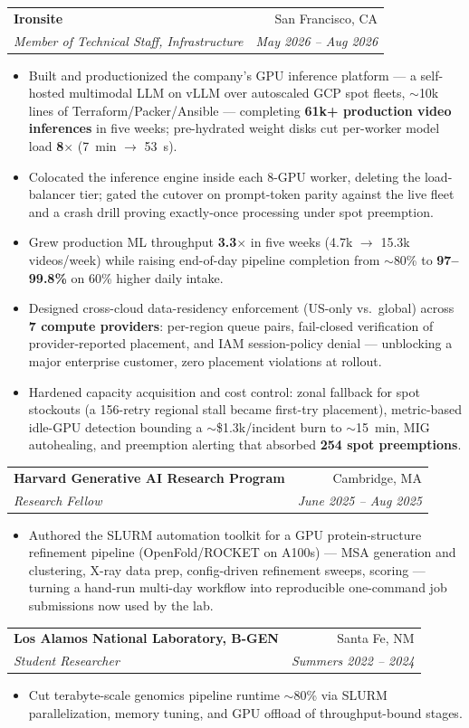 \documentclass[letterpaper,10pt]{article}
\makeatletter
\newcommand{\resumeItem}[1]{
  \item\small{
    {#1 \vspace{-2pt}}
  }
}
\newcommand{\resumeSubheading}[4]{
  \vspace{-2pt}\item
    \begin{tabular*}{0.97\textwidth}[t]{l@{\extracolsep{\fill}}r}
      \textbf{#1} & #2 \\
      \textit{\small#3} & \textit{\small #4} \\
    \end{tabular*}\vspace{-7pt}
}
\newcommand{\resumeItemListStart}{\begin{itemize}}
\newcommand{\resumeItemListEnd}{\end{itemize}\vspace{-5pt}}
\makeatother
\begin{document}
    \resumeSubheading
      {Ironsite}{San Francisco, CA}
      {Member of Technical Staff, Infrastructure}{May 2026 -- Aug 2026}
      \resumeItemListStart
        \resumeItem{Built and productionized the company's GPU inference platform --- a self-hosted multimodal LLM on vLLM over autoscaled GCP spot fleets, $\sim$10k lines of Terraform/Packer/Ansible --- completing \textbf{61k+ production video inferences} in five weeks; pre-hydrated weight disks cut per-worker model load \textbf{8$\times$} (7~min $\rightarrow$ 53~s).}
        \resumeItem{Colocated the inference engine inside each 8-GPU worker, deleting the load-balancer tier; gated the cutover on prompt-token parity against the live fleet and a crash drill proving exactly-once processing under spot preemption.}
        \resumeItem{Grew production ML throughput \textbf{3.3$\times$} in five weeks (4.7k $\rightarrow$ 15.3k videos/week) while raising end-of-day pipeline completion from $\sim$80\% to \textbf{97--99.8\%} on 60\% higher daily intake.}
        \resumeItem{Designed cross-cloud data-residency enforcement (US-only vs.\ global) across \textbf{7 compute providers}: per-region queue pairs, fail-closed verification of provider-reported placement, and IAM session-policy denial --- unblocking a major enterprise customer, zero placement violations at rollout.}
        \resumeItem{Hardened capacity acquisition and cost control: zonal fallback for spot stockouts (a 156-retry regional stall became first-try placement), metric-based idle-GPU detection bounding a $\sim$\$1.3k/incident burn to $\sim$15~min, MIG autohealing, and preemption alerting that absorbed \textbf{254 spot preemptions}.}
      \resumeItemListEnd

    \resumeSubheading
      {Harvard Generative AI Research Program}{Cambridge, MA}
      {Research Fellow}{June 2025 -- Aug 2025}
      \resumeItemListStart
        \resumeItem{Authored the SLURM automation toolkit for a GPU protein-structure refinement pipeline (OpenFold/ROCKET on A100s) --- MSA generation and clustering, X-ray data prep, config-driven refinement sweeps, scoring --- turning a hand-run multi-day workflow into reproducible one-command job submissions now used by the lab.}
      \resumeItemListEnd

    \resumeSubheading
      {Los Alamos National Laboratory, B-GEN}{Santa Fe, NM}
      {Student Researcher}{Summers 2022 -- 2024}
      \resumeItemListStart
        \resumeItem{Cut terabyte-scale genomics pipeline runtime $\sim$80\% via SLURM parallelization, memory tuning, and GPU offload of throughput-bound stages.}
      \resumeItemListEnd
\end{document}
